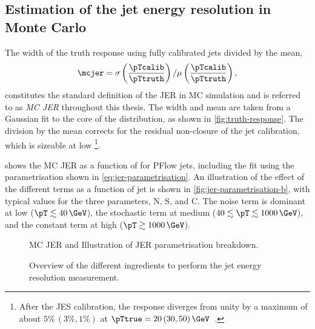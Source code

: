 \subsection{Estimation of the jet energy resolution in Monte Carlo}
The width of the truth response using fully calibrated jets  divided by the mean,
\begin{equation}
    \mcjer = \sigma \left( \frac{\pTcalib}{\pTtruth} \right) / \mu \left( \frac{\pTcalib}{\pTtruth} \right),
\end{equation}
constitutes the standard definition of the JER in MC simulation and is referred to as \emph{MC JER} throughout this thesis.
The width and mean are taken from a Gaussian fit to the core of the distribution, as shown in \cref{fig:truth-response}. The division by the mean corrects for the residual non-closure of the jet calibration, which is sizeable at low \pT\footnote{After the JES calibration, the response diverges from unity by a maximum of about $5\%\,(3\%, 1\%)$ at $\pTtrue = 20\,(30, 50)\,\GeV$~\cite{JETM-2018-05}.}.

 shows the MC JER as a function of \pTtruth for PFlow jets, including the fit using the parametrisation shown in \cref{eq:jer-parametrisation}.
An illustration of the effect of the different terms as a function of jet \pT is shown in \cref{fig:jer-parametrisation-b}, with typical values for the three parameters, N, S, and C. The noise term is dominant at low \pT ($\pT \lesssim 40\,\GeV$), the stochastic term at medium \pT ($40 \lesssim \pT \lesssim 1000\,\GeV$), and the constant term at high \pT ($\pT \gtrsim 1000\,\GeV$).


\FloatBarrier
\begin{figure}[t]
    \caption{MC JER and Illustration of JER parametrisation breakdown.}
    \label{fig:jer-parametrisation}
\end{figure}

\FloatBarrier
\begin{figure}[t]
    \caption{Overview of the different ingredients to perform the jet energy resolution measurement.}
    \label{fig:flow-chart-jer}
\end{figure}


